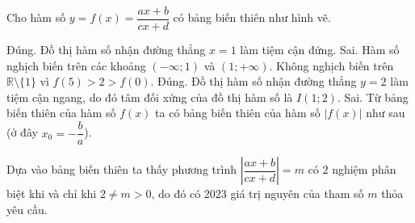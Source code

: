 \begin{ex}%
Cho hàm số $y=f(x)=\dfrac{ax+b}{cx+d}$ có bảng biến thiên như hình vẽ.
{
}
\begin{itemchoice}
	\itemch Đúng. Đồ thị hàm số nhận đường thẳng $x=1$ làm tiệm cận đứng.
	\itemch Sai. Hàm số nghịch biến trên các khoảng $(-\infty;1)$ và $(1;+\infty)$. Không nghịch biến trên $\mathbb{R}\setminus \{1\}$ vì $f(5)>2>f(0)$.
	\itemch Đúng. Đồ thị hàm số nhận đường thẳng $y=2$ làm tiệm cận ngang, do đó tâm đối xứng của đồ thị hàm số là $I(1;2)$.
	\itemch Sai. Từ bảng biến thiên của hàm số $f(x)$ ta có bảng biến thiên của hàm số $|f(x)|$ như sau (ở đây $x_0=-\dfrac{b}{a}$).
\begin{center}\end{center}
Dựa vào bảng biến thiên ta thấy phương trình $\left|\dfrac{ax+b}{cx+d}\right|=m$ có $2$ nghiệm phân biệt khi và chỉ khi $2\neq m >0$, do đó có $2023$ giá trị nguyên của tham số $m$ thỏa yêu cầu.
\end{itemchoice}
\end{ex}
